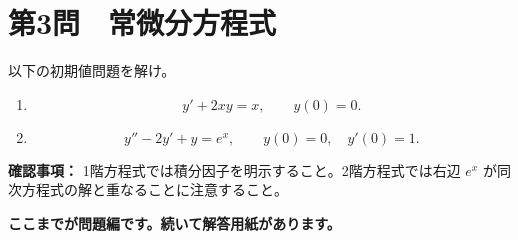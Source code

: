 \section*{第3問　常微分方程式 }
以下の初期値問題を解け。

\begin{enumerate}
  \item
  \[
  y'+2xy=x,\qquad y(0)=0.
  \]

  \item
  \[
  y''-2y'+y=e^x,\qquad y(0)=0,\quad y'(0)=1.
  \]
\end{enumerate}

\vspace{10mm}
\begin{pointbox}
\textbf{確認事項：}
1階方程式では積分因子を明示すること。2階方程式では右辺 $e^x$ が同次方程式の解と重なることに注意すること。
\end{pointbox}

\vfill
\begin{center}
\large\bfseries ここまでが問題編です。続いて解答用紙があります。
\end{center}
\newpage
